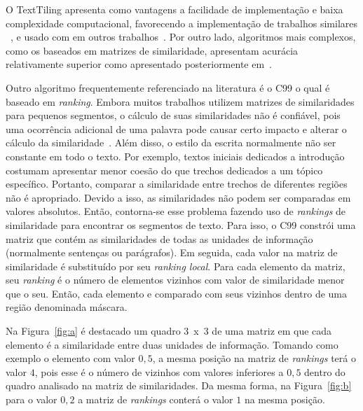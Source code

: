 O TextTiling apresenta como vantagens a facilidade de implementação e baixa complexidade computacional, favorecendo a implementação de trabalhos similares ~\cite{Naili2016,Bokaei2015,CHAIBI2014,Kern2009,Galley2003}, e usado com  em outros trabalhos~\cite{Cardoso2017,Dias2007}. Por outro lado, algoritmos mais complexos, como os baseados em matrizes de similaridade, apresentam acurácia relativamente superior como apresentado posteriormente  em~\cite{Choi2000, Kern2009, Misra2009}.



Outro algoritmo frequentemente referenciado na literatura é o C99 o qual é baseado em \textit{ranking}. Embora muitos trabalhos utilizem matrizes de similaridades para pequenos segmentos, o cálculo de suas similaridades não é confiável, pois uma ocorrência adicional de uma palavra pode causar certo impacto e alterar o cálculo da similaridade~\cite{Choi2000}. Além disso, o estilo da escrita normalmente não ser constante em todo o texto. Por exemplo, textos iniciais dedicados a introdução costumam apresentar menor coesão do que trechos dedicados a um tópico específico. Portanto, comparar a similaridade entre trechos de diferentes regiões não é apropriado. Devido a isso, as similaridades não podem ser comparadas em valores absolutos. Então, contorna-se esse problema fazendo uso de \textit{rankings} de similaridade para encontrar os segmentos de texto. Para isso, o C99 constrói uma matriz que contém as similaridades de todas as unidades de informação (normalmente sentenças ou parágrafos). Em seguida, cada valor na matriz de similaridade é substituído por seu \textit{ranking local}. Para cada elemento da matriz, seu \textit{ranking} é o número de elementos vizinhos com valor de similaridade menor que o seu. Então, cada elemento e comparado com seus vizinhos dentro de uma região denominada máscara.

Na Figura~\ref{fig:a} é destacado um quadro 3~x~3 de uma matriz em que cada elemento é a similaridade entre duas unidades de informação. Tomando como exemplo o elemento com valor $0,5$, a mesma posição na matriz de \textit{rankings} terá o valor $4$, pois esse é o número de vizinhos com valores inferiores a $0,5$ dentro do quadro analisado na matriz de similaridades. Da mesma forma, na Figura~\ref{fig:b} para o valor $0,2$ a matriz de \textit{rankings} conterá o valor $1$ na mesma posição.


